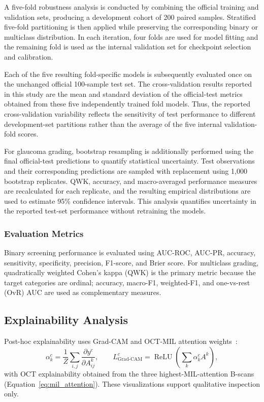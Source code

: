 \documentclass[sn-mathphys]{sn-jnl}%
\theoremstyle{thmstyleone}%
\theoremstyle{thmstyletwo}%
\theoremstyle{thmstylethree}%
\begin{document}
A five-fold robustness analysis is conducted by combining the official training and validation sets, producing a development cohort of 200 paired samples. Stratified five-fold partitioning is then applied while preserving the corresponding binary or multiclass distribution. In each iteration, four folds are used for model fitting and the remaining fold is used as the internal validation set for checkpoint selection and calibration.

Each of the five resulting fold-specific models is subsequently evaluated once on the unchanged official 100-sample test set. The cross-validation results reported in this study are the mean and standard deviation of the official-test metrics obtained from these five independently trained fold models. Thus, the reported cross-validation variability reflects the sensitivity of test performance to different development-set partitions rather than the average of the five internal validation-fold scores.

For glaucoma grading, bootstrap resampling is additionally performed using the final official-test predictions to quantify statistical uncertainty. Test observations and their corresponding predictions are sampled with replacement using 1,000 bootstrap replicates. QWK, accuracy, and macro-averaged performance measures are recalculated for each replicate, and the resulting empirical distributions are used to estimate 95\% confidence intervals. This analysis quantifies uncertainty in the reported test-set performance without retraining the models.

\subsubsection{Evaluation Metrics}
\label{subsubsec:evaluation_metrics}

Binary screening performance is evaluated using AUC-ROC, AUC-PR, accuracy, sensitivity, specificity, precision, F1-score, and Brier score. For multiclass grading, quadratically weighted Cohen's kappa (QWK) is the primary metric because the target categories are ordinal; accuracy, macro-F1, weighted-F1, and one-vs-rest (OvR) AUC are used as complementary measures.

\subsection{Explainability Analysis}
\label{subsec:explainability}

Post-hoc explainability uses Grad-CAM and OCT-MIL attention weights~\cite{lai2024interpretable,bhuiyan2024interpretable}:
\begin{equation}
    \alpha_k^c=\frac{1}{Z}\sum_{i,j}\frac{\partial y^c}{\partial A_{ij}^k},\qquad
    L_{\mathrm{Grad\text{-}CAM}}^c=\operatorname{ReLU}\!\left(\sum_k \alpha_k^c A^k\right),
    \label{eq:gradcam}
\end{equation}
with OCT explainability obtained from the three highest-MIL-attention B-scans (Equation~\eqref{eq:mil_attention}). These visualizations support qualitative inspection only.
\end{document}
